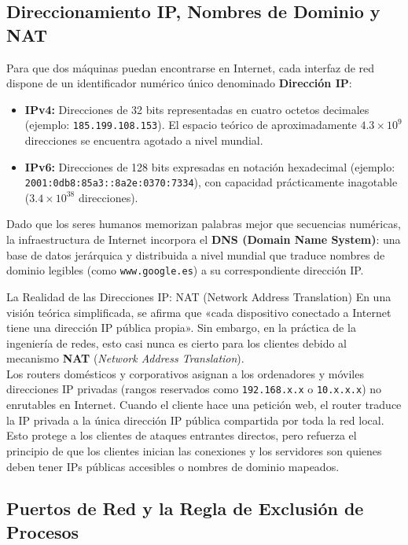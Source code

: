 \subsection{Direccionamiento IP, Nombres de Dominio y NAT}

Para que dos máquinas puedan encontrarse en Internet, cada interfaz de red dispone de un identificador numérico único denominado \textbf{Dirección IP}:
\begin{itemize}[leftmargin=1.2cm]
  \item \textbf{IPv4:} Direcciones de 32 bits representadas en cuatro octetos decimales (ejemplo: \texttt{185.199.108.153}). El espacio teórico de aproximadamente $4.3 \times 10^9$ direcciones se encuentra agotado a nivel mundial.
  \item \textbf{IPv6:} Direcciones de 128 bits expresadas en notación hexadecimal (ejemplo: \texttt{2001:0db8:85a3::8a2e:0370:7334}), con capacidad prácticamente inagotable ($3.4 \times 10^{38}$ direcciones).
\end{itemize}

Dado que los seres humanos memorizan palabras mejor que secuencias numéricas, la infraestructura de Internet incorpora el \textbf{DNS (Domain Name System)}: una base de datos jerárquica y distribuida a nivel mundial que traduce nombres de dominio legibles (como \texttt{www.google.es}) a su correspondiente dirección IP.

\begin{importante}{La Realidad de las Direcciones IP: NAT (Network Address Translation)}
En una visión teórica simplificada, se afirma que «cada dispositivo conectado a Internet tiene una dirección IP pública propia». Sin embargo, en la práctica de la ingeniería de redes, esto casi nunca es cierto para los clientes debido al mecanismo \textbf{NAT} (\textit{Network Address Translation}).\\
Los routers domésticos y corporativos asignan a los ordenadores y móviles direcciones IP privadas (rangos reservados como \texttt{192.168.x.x} o \texttt{10.x.x.x}) no enrutables en Internet. Cuando el cliente hace una petición web, el router traduce la IP privada a la única dirección IP pública compartida por toda la red local. Esto protege a los clientes de ataques entrantes directos, pero refuerza el principio de que los clientes inician las conexiones y los servidores son quienes deben tener IPs públicas accesibles o nombres de dominio mapeados.
\end{importante}

\subsection{Puertos de Red y la Regla de Exclusión de Procesos}

